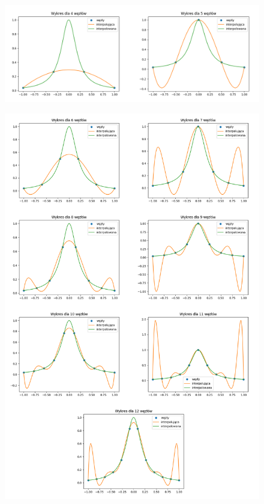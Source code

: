 \documentclass{article}
\begin{document}
\begin{figure}[H]
    \centering
    \includegraphics[width=\linewidth]{wykresy1.png}
\end{figure}
\begin{figure}[H]
    \centering
    \includegraphics[width=\linewidth]{wykresy2.png}
\end{figure}
\end{document}
